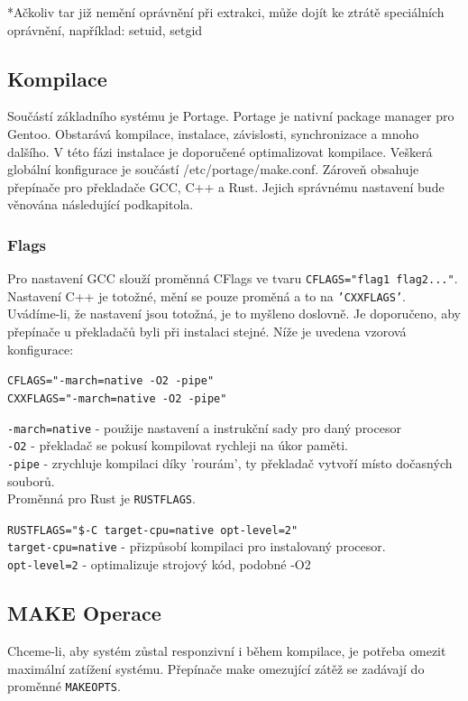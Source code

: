 \documentclass[12pt,a4paper,twoside,]{article}
\begin{document}
{*Ačkoliv tar již nemění oprávnění při extrakci, může dojít ke
ztrátě speciálních oprávnění, například: setuid, setgid

\newpage
\subsection{\textsf{Kompilace}}
Součástí základního systému je Portage. Portage je nativní package manager pro Gentoo.
Obstarává kompilace, instalace, závislosti, synchronizace a mnoho dalšího. V této fázi instalace
je doporučené optimalizovat kompilace. Veškerá globální konfigurace je součástí /etc/portage/make.conf.
Zároveň obsahuje přepínače pro překladače GCC, C++ a Rust. Jejich správnému nastavení bude věnována následující podkapitola.

\subsubsection{\textsf{Flags}}
Pro nastavení GCC slouží proměnná CFlags ve tvaru \texttt{CFLAGS="flag1 flag2..."}. Nastavení C++ je totožné, mění se pouze proměná a to na \texttt{'CXXFLAGS'}.
Uvádíme-li, že nastavení jsou totožná, je to myšleno doslovně. Je doporučeno, aby přepínače u překladačů byli při instalaci stejné. Níže je uvedena
vzorová konfigurace:

\texttt{CFLAGS="-march=native -O2 -pipe"}\\
\texttt{CXXFLAGS="-march=native -O2 -pipe"}

\texttt{-march=native} - použije nastavení a instrukční sady pro daný procesor\\
\texttt{-O2} - překladač se pokusí kompilovat rychleji na úkor paměti.\\
\texttt{-pipe} - zrychluje kompilaci díky 'rourám', ty překladač vytvoří místo dočasných souborů.\\

Proměnná pro Rust je \texttt{RUSTFLAGS}.

\texttt{RUSTFLAGS="\$-C target-cpu=native opt-level=2"}\\

\texttt{target-cpu=native} - přizpůsobí kompilaci pro instalovaný procesor.\\
\texttt{opt-level=2} - optimalizuje strojový kód, podobné -O2      %

\subsection{\textsf{MAKE Operace}}
Chceme-li, aby systém zůstal responzivní i během kompilace, je potřeba omezit maximální zatížení systému.
Přepínače make omezující zátěž se zadávají do proměnné \texttt{MAKEOPTS}.

}
\end{document}
